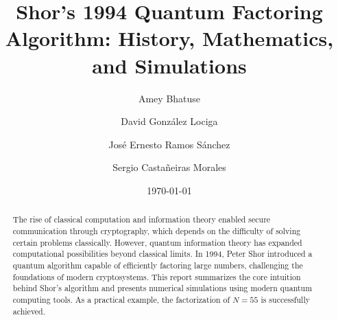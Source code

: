 \documentclass[aps,prl,twocolumn,superscriptaddress,groupedaddress]{revtex4}  %
\begin{document}
\title{
Shor’s 1994 Quantum Factoring Algorithm: History, Mathematics, and Simulations}

\author{Amey Bhatuse}

\author{David González Lociga}

\author{José Ernesto Ramos Sánchez}

\author{Sergio Castañeiras Morales}


\date{\today}

\begin{abstract}

The rise of classical computation and information theory enabled secure communication through cryptography, which depends on the difficulty of solving certain problems classically. However, quantum information theory has expanded computational possibilities beyond classical limits. In 1994, Peter Shor introduced a quantum algorithm capable of efficiently factoring large numbers, challenging the foundations of modern cryptosystems. This report summarizes the core intuition behind Shor’s algorithm
and 
presents numerical simulations using modern quantum computing tools. As a practical example, the factorization of  $N=55$ is successfully achieved.





\end{abstract}
\end{document}

